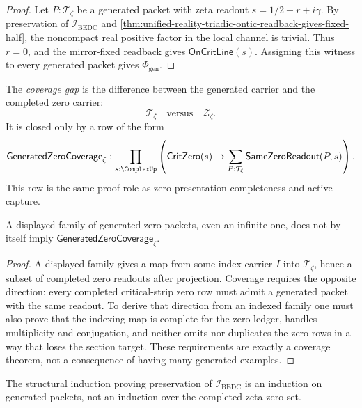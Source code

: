 \begin{proof}
Let $P:\mathcal T_{\zeta}$ be a generated packet with zeta readout
$s=1/2+r+i\gamma$.  By preservation of
$\mathcal I_{\mathrm{BEDC}}$ and
\autoref{thm:unified-reality-triadic-ontic-readback-gives-fixed-half},
the noncompact real positive factor in the local channel is trivial.
Thus $r=0$, and the mirror-fixed readback gives
$\mathsf{OnCritLine}(s)$.  Assigning this witness to every generated
packet gives $\Phi_{\mathrm{gen}}$.
\end{proof}

\begin{definition}
\label{def:unified-reality-coverage-gap}
The \emph{coverage gap} is the difference between the generated carrier
and the completed zero carrier:
$$
\mathcal T_{\zeta}
\quad\text{versus}\quad
\mathcal Z_{\zeta}.
$$
It is closed only by a row of the form
$$
\mathsf{GeneratedZeroCoverage}_{\zeta}
:
\prod_{s:\ComplexUp}
\left(
\mathsf{CritZero}(s)
\to
\sum_{P:\mathcal T_{\zeta}}
\mathsf{SameZeroReadout}(P,s)
\right).
$$
This row is the same proof role as zero presentation completeness and
active capture.
\end{definition}

\begin{theorem}
\label{thm:unified-reality-many-generated-zeros-do-not-close-coverage-gap}
A displayed family of generated zero packets, even an infinite one, does
not by itself imply $\mathsf{GeneratedZeroCoverage}_{\zeta}$.
\end{theorem}

\begin{proof}
A displayed family gives a map from some index carrier $I$ into
$\mathcal T_{\zeta}$, hence a subset of completed zero readouts after
projection.  Coverage requires the opposite direction: every completed
critical-strip zero row must admit a generated packet with the same
readout.  To derive that direction from an indexed family one must also
prove that the indexing map is complete for the zero ledger, handles
multiplicity and conjugation, and neither omits nor duplicates the
zero rows in a way that loses the section target.  These requirements
are exactly a coverage theorem, not a consequence of having many
generated examples.
\end{proof}

\begin{corollary}
\label{cor:unified-reality-successor-induction-not-coverage-proof}
The structural induction proving preservation of
$\mathcal I_{\mathrm{BEDC}}$ is an induction on generated packets, not
an induction over the completed zeta zero set.
\end{corollary}

